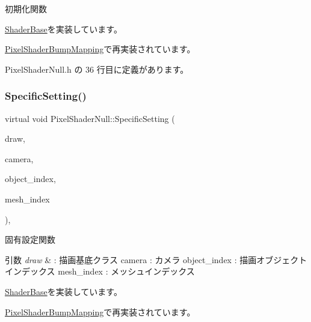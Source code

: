 初期化関数 



\mbox{\hyperlink{class_shader_base_a9622b2f5e0184a78d3af82820dc5113d}{Shader\+Base}}を実装しています。



\mbox{\hyperlink{class_pixel_shader_bump_mapping_ab7807b7c56242e965ddb23e66e1a5d9e}{Pixel\+Shader\+Bump\+Mapping}}で再実装されています。



 Pixel\+Shader\+Null.\+h の 36 行目に定義があります。

\mbox{\label{class_pixel_shader_null_a8dd0194b5a22da5261ab35233a7cfdcd}} 
\subsubsection{\texorpdfstring{Specific\+Setting()}{SpecificSetting()}}
{\footnotesize\ttfamily virtual void Pixel\+Shader\+Null\+::\+Specific\+Setting (\begin{DoxyParamCaption}\item[{\mbox{\hyperlink{class_draw_base}{Draw\+Base}} $\ast$}]{draw,  }\item[{\mbox{\hyperlink{class_camera}{Camera}} $\ast$}]{camera,  }\item[{unsigned}]{object\+\_\+index,  }\item[{unsigned}]{mesh\+\_\+index }\end{DoxyParamCaption})\hspace{0.3cm}{\ttfamily [inline]}, {\ttfamily [virtual]}}



固有設定関数 


\begin{DoxyParams}{引数}
{\em draw} & \+: 描画基底クラス camera \+: カメラ object\+\_\+index \+: 描画オブジェクトインデックス mesh\+\_\+index \+: メッシュインデックス \\
\hline
\end{DoxyParams}


\mbox{\hyperlink{class_shader_base_ac78c78ede3b8e48cf28b739b97456620}{Shader\+Base}}を実装しています。



\mbox{\hyperlink{class_pixel_shader_bump_mapping_afa80c2404b490a444d54cc47c681ca8f}{Pixel\+Shader\+Bump\+Mapping}}で再実装されています。



